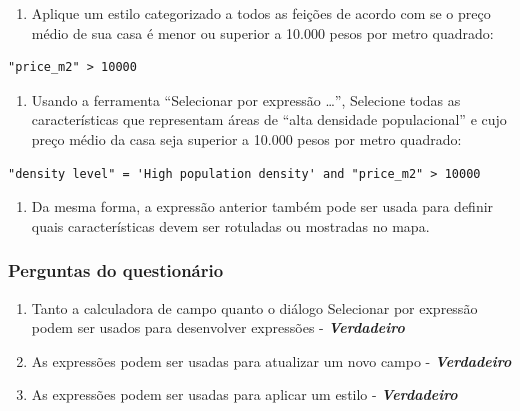 \documentclass[
  portuguese,
]{krantz}
\providecommand{\tightlist}{%
  \setlength{\itemsep}{0pt}\setlength{\parskip}{0pt}}
\begin{document}
\begin{enumerate}
\def\labelenumi{\arabic{enumi}.}
\setcounter{enumi}{2}
\tightlist
\item
  Aplique um estilo categorizado a todos as feições de acordo com se o preço médio de sua casa é menor ou superior a 10.000 pesos por metro quadrado:
\end{enumerate}

\begin{verbatim}
"price_m2" > 10000
\end{verbatim}

\begin{enumerate}
\def\labelenumi{\arabic{enumi}.}
\setcounter{enumi}{3}
\tightlist
\item
  Usando a ferramenta ``Selecionar por expressão \ldots{}'', Selecione todas as características que representam áreas de ``alta densidade populacional'' e cujo preço médio da casa seja superior a 10.000 pesos por metro quadrado:
\end{enumerate}

\begin{verbatim}
"density level" = 'High population density' and "price_m2" > 10000
\end{verbatim}

\begin{enumerate}
\def\labelenumi{\arabic{enumi}.}
\setcounter{enumi}{4}
\tightlist
\item
  Da mesma forma, a expressão anterior também pode ser usada para definir quais características devem ser rotuladas ou mostradas no mapa.
\end{enumerate}

\hypertarget{perguntas-do-questionuxe1rio-13}{%
\subsubsection{\texorpdfstring{\textbf{Perguntas do questionário}}{Perguntas do questionário}}\label{perguntas-do-questionuxe1rio-13}}

\begin{enumerate}
\def\labelenumi{\arabic{enumi}.}
\tightlist
\item
  Tanto a calculadora de campo quanto o diálogo Selecionar por expressão podem ser usados para desenvolver expressões - \textbf{\emph{Verdadeiro}}
\item
  As expressões podem ser usadas para atualizar um novo campo - \textbf{\emph{Verdadeiro}}
\item
  As expressões podem ser usadas para aplicar um estilo - \textbf{\emph{Verdadeiro}}
\end{enumerate}
\end{document}
